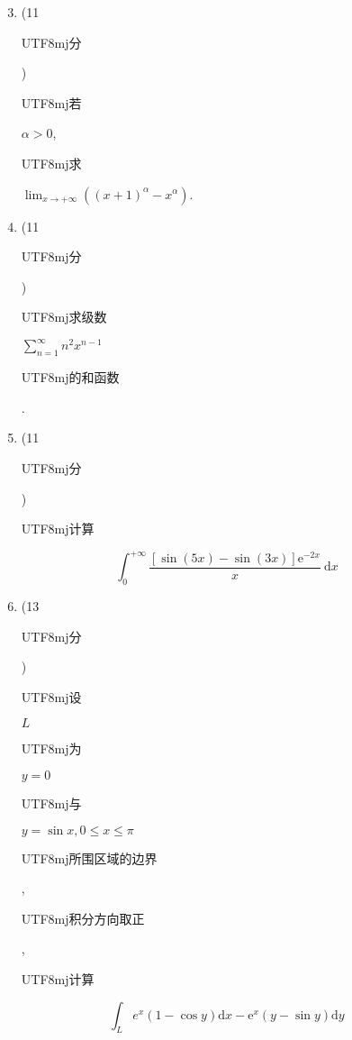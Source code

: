 \documentclass[10pt]{article}
\begin{document}
\begin{enumerate}
  \setcounter{enumi}{2}
  \item (11 \begin{CJK}{UTF8}{mj}分\end{CJK}) \begin{CJK}{UTF8}{mj}若\end{CJK} $\alpha>0$, \begin{CJK}{UTF8}{mj}求\end{CJK} $\lim _{x \rightarrow+\infty}\left((x+1)^{\alpha}-x^{\alpha}\right)$.

  \item (11 \begin{CJK}{UTF8}{mj}分\end{CJK}) \begin{CJK}{UTF8}{mj}求级数\end{CJK} $\sum_{n=1}^{\infty} n^{2} x^{n-1}$ \begin{CJK}{UTF8}{mj}的和函数\end{CJK}.

  \item (11 \begin{CJK}{UTF8}{mj}分\end{CJK}) \begin{CJK}{UTF8}{mj}计算\end{CJK}

\end{enumerate}
$$
\int_{0}^{+\infty} \frac{[\sin (5 x)-\sin (3 x)] \mathrm{e}^{-2 x}}{x} \mathrm{~d} x
$$

\begin{enumerate}
  \setcounter{enumi}{5}
  \item (13 \begin{CJK}{UTF8}{mj}分\end{CJK}) \begin{CJK}{UTF8}{mj}设\end{CJK} $L$ \begin{CJK}{UTF8}{mj}为\end{CJK} $y=0$ \begin{CJK}{UTF8}{mj}与\end{CJK} $y=\sin x, 0 \leq x \leq \pi$ \begin{CJK}{UTF8}{mj}所围区域的边界\end{CJK}, \begin{CJK}{UTF8}{mj}积分方向取正\end{CJK}, \begin{CJK}{UTF8}{mj}计算\end{CJK}
\end{enumerate}
$$
\int_{L} e^{x}(1-\cos y) \mathrm{d} x-\mathrm{e}^{x}(y-\sin y) \mathrm{d} y
$$
\end{document}
